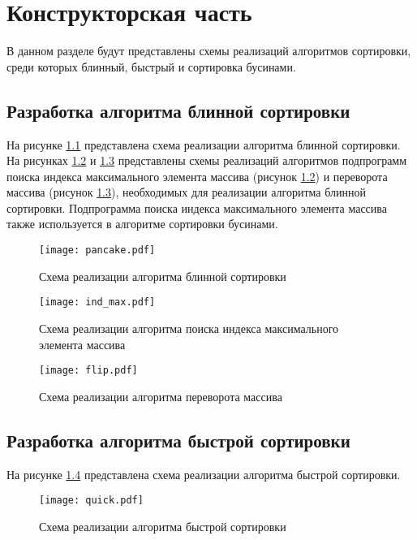 \chapter{Конструкторская часть}

В данном разделе будут представлены схемы реализаций алгоритмов сортировки, среди которых блинный, быстрый и сортировка бусинами.

\section{Разработка алгоритма блинной сортировки}
На рисунке \ref{img:pancake} представлена схема реализации алгоритма блинной сортировки. На рисунках \ref{img:ind_max} и \ref{img:flip} представлены схемы реализаций алгоритмов подпрограмм поиска индекса максимального элемента массива (рисунок \ref{img:ind_max}) и переворота массива (рисунок \ref{img:flip}), необходимых для реализации алгоритма блинной сортировки. Подпрограмма поиска индекса максимального элемента массива также используется в алгоритме сортировки бусинами.%

\begin{figure}[h!]
    \centering
    \texttt{[image: pancake.pdf]}
    \caption{Схема реализации алгоритма блинной сортировки}
    \label{img:pancake}
\end{figure}

\begin{figure}[h!]
    \centering
    \texttt{[image: ind\_max.pdf]}
    \caption{Схема реализации алгоритма поиска индекса максимального элемента массива}
    \label{img:ind_max}
\end{figure}

\begin{figure}[h!]
    \centering
    \texttt{[image: flip.pdf]}
    \caption{Схема реализации алгоритма переворота массива}
    \label{img:flip}
\end{figure}

\section{Разработка алгоритма быстрой сортировки}
На рисунке \ref{img:quick} представлена схема реализации алгоритма быстрой сортировки.

\begin{figure}[h!]
    \centering
    \texttt{[image: quick.pdf]}
    \caption{Схема реализации алгоритма быстрой сортировки}
    \label{img:quick}
\end{figure}

